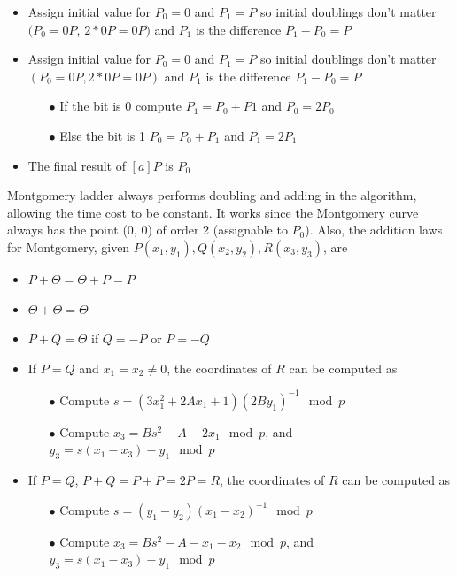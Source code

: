\begin{itemize}
  \item Assign initial value for $P_0 = 0$ and $P_1 = P$ so initial doublings don’t matter $(P_0 =0P$, $2*0P = 0P)$ and $P_1$ is the difference $P_1 - P_0 = P$
  \item Assign initial value for $P_0 = 0$ and $P_1 = P$ so initial doublings don’t matter $(P_0 =0P, 2*0P = 0P)$ and $P_1$ is the difference $P_1 - P_0 = P$

        \begin{itemize}
          \item[$\bullet$] If the bit is 0 compute $P_1 = P_0 +  P1$ and $P_0 = 2P_0$
          \item[$\bullet$] Else the bit is 1 $P_0 = P_0 +  P_1$ and $P_1 = 2P_1$
        \end{itemize}

  \item The final result of $[a]P$ is $P_0$
\end{itemize}

Montgomery ladder always performs doubling and adding in the algorithm, allowing the time cost to be constant. It works since the Montgomery curve always has the point (0, 0) of order 2 (assignable to $P_0$). Also, the addition laws for Montgomery, given $P(x_1, y_1), Q(x_2, y_2), R(x_3, y_3)$, are

\begin{itemize}
  \item $P + \Theta = \Theta + P = P$
  \item $\Theta + \Theta = \Theta$
  \item $P + Q = \Theta$ if $Q = -P$ or $P = -Q$
  \item If $P = Q$ and $x_1 = x_2 \neq 0$, the coordinates of $R$ can be computed as

        \begin{itemize}
          \item[$\bullet$] Compute $s = (3x_1^2 + 2Ax_1 + 1) (2By_1)^{-1} \mod p$
          \item[$\bullet$] Compute $x_3 = Bs^2 - A - 2x_1 \mod p$, and $y_3 = s(x_1 - x_3) - y_1 \mod p$
        \end{itemize}

  \item If $P = Q$, $P + Q = P + P = 2P = R$, the coordinates of $R$ can be computed as

        \begin{itemize}
          \item[$\bullet$] Compute $s = (y_1 - y_2) (x_1 - x_2)^{-1} \mod p$
          \item[$\bullet$] Compute $x_3 = Bs^2 - A - x_1 - x_2 \mod p$, and $y_3 = s(x_1 - x_3) - y_1 \mod p$
        \end{itemize}
\end{itemize}

